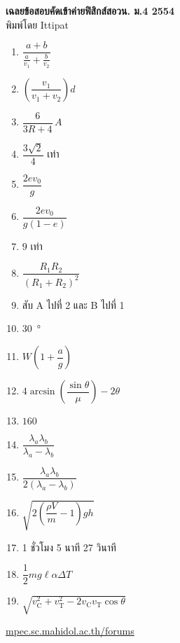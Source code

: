 \documentclass[a4paper,12pt]{article}
\begin{document}
\thispagestyle{empty}
\begin{center}
	{\huge \textbf{เฉลยข้อสอบคัดเข้าค่ายฟิสิกส์สอวน. ม.\textenglish{4} 2554}}\\
	พิมพ์โดย Ittipat\\
\end{center}
\begin{enumerate}
	\item \(\dfrac{a + b}{ \frac{a}{v_1} + \frac{b}{v_2} }\)
	\item \(\left( \dfrac{v_1}{v_1 + v_2} \right)d\)
	\item \(\dfrac{6}{3R + 4}\,\si{A}\)
	\item \(\dfrac{ 3 \sqrt{2} }{4}\) เท่า
	\item \(\dfrac{2ev_0}{g}\)
	\item \(\dfrac{2ev_0}{g(1-e)}\)
	\item \(9\) เท่า
	\item \(\dfrac{R_1  R_2 }{ (R_1 + R_2)^2 }\)
	\item สับ A ไปที่ 2 และ B ไปที่ 1
	\item \SI{30}{\degree}
	\item \(W \left( 1 + \dfrac{a}{g} \right)\)
	\item \(4\arcsin\left( \dfrac{ \sin \theta}{ \mu} \right) - 2\theta\)
	\item \(160\)
	\item \( \dfrac{ \lambda_a \lambda_b}{ \lambda_a - \lambda_b}\)
	\item \(\dfrac{ \lambda_a \lambda_b}{ 2(\lambda_a - \lambda_b)}\)
	\item \(\sqrt{ 2\left( \dfrac{ \rho V}{m} - 1\right) gh}\)
	\item 1 ชั่วโมง 5 นาที 27 วินาที
	\item \(\dfrac{1}{2}mg\ell \alpha \Delta T\)
	\item \(\sqrt{ v_\text{C}^2 + v_\text{T}^2 - 2v_\text{C} v_\text{T} \cos \theta }\)
\end{enumerate}
\vfill	
\begin{center}
	\href{http://mpec.sc.mahidol.ac.th/forums/}{mpec.sc.mahidol.ac.th/forums}
\end{center}
\end{document}
